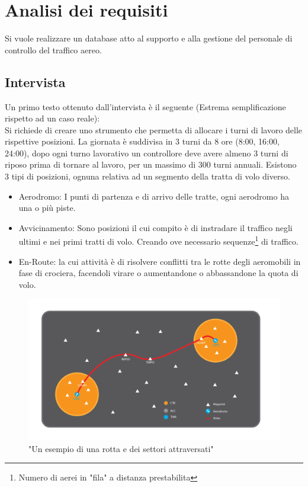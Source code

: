 \chapter{Analisi dei requisiti}
Si vuole realizzare un database atto al supporto e alla gestione del personale di controllo del traffico aereo.
\section{Intervista}
Un primo testo ottenuto dall'intervista è il seguente (Estrema semplificazione rispetto ad un caso reale):\\
Si richiede di creare uno strumento che permetta di allocare i turni di lavoro delle rispettive posizioni. La giornata è suddivisa in 3 turni da 8 ore (8:00, 16:00, 24:00), dopo ogni turno lavorativo un controllore deve avere almeno 3 turni di riposo prima di tornare al lavoro, per un massimo di 300 turni annuali.
Esistono 3 tipi di posizioni, ognuna relativa ad un segmento della tratta di volo diverso. 
\begin{itemize}
    \item Aerodromo:
I punti di partenza e di arrivo delle tratte, ogni aerodromo ha una o più piste. %
\item Avvicinamento:
Sono posizioni il cui compito è di instradare il traffico negli ultimi e nei primi tratti di volo. Creando ove necessario sequenze\footnote{Numero di aerei in "fila" a distanza prestabilita} di traffico.
\item En-Route:
la cui attività è di risolvere conflitti tra le rotte degli aeromobili in fase di crociera, facendoli virare o aumentandone o abbassandone la quota di volo.
\end{itemize}
\begin{figure}[H]
  \centering
  \includegraphics[width=1\textwidth]{figures/Rotta.png}
  \caption{"Un esempio di una rotta e dei settori attraversati"}
\end{figure}
